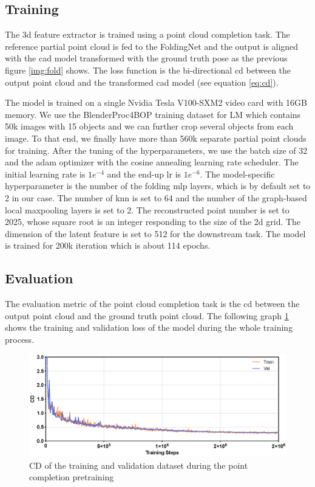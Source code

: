 \documentclass[12pt,DIV14,BCOR12mm,a4paper,footinclude=false,headinclude,parskip=half-,twoside,openright,cleardoublepage=empty,toc=index,bibliography=totoc,listof=totoc]{scrreprt}
\numberwithin{equation}{chapter}
\begin{document}
\subsection{Training} 
The \gls{3d} feature extractor is trained using a point cloud completion task. The reference partial point cloud is fed to the FoldingNet and the output is aligned with the \gls{cad} model transformed with the ground truth pose as the previous figure \ref{img:fold} shows. The loss function is the bi-directional \gls{cd} between the output point cloud and the transformed \gls{cad} model (see equation \ref{eq:cd}).

The model is trained on a single Nvidia Tesla V100-SXM2 video card with 16GB memory. We use the BlenderProc4BOP training dataset for LM which contains 50k images with 15 objects and we can further crop several objects from each image. To that end, we finally have more than 560k separate partial point clouds for training. After the tuning of the hyperparameters, we use the batch size of 32 and the \gls{adam} optimizer with the cosine annealing learning rate scheduler. The initial learning rate is $1e^{-4}$ and the end-up \gls{lr} is $1e^{-6}$. The model-specific hyperparameter is the number of the folding \gls{mlp} layers, which is by default set to 2 in our case. The number of \gls{knn} is set to 64 and the number of the graph-based local maxpooling layers is set to 2. The reconstructed point number is set to 2025, whose square root is an integer responding to the size of the \gls{2d} grid. The dimension of the latent feature is set to 512 for the downstream task. The model is trained for 200k iteration which is about 114 epochs.
\subsection{Evaluation} 
The evaluation metric of the point cloud completion task is the \gls{cd} between the output point cloud and the ground truth point cloud. The following graph \ref{img:fold_loss} shows the training and validation loss of the model during the whole training process. 

\begin{figure}[h]
	\centering
	\includegraphics[width=1.\textwidth]{img/fold_loss.eps}
	\caption{CD of the training and validation dataset during the point completion pretraining}
	\label{img:fold_loss}
\end{figure}
\end{document}
